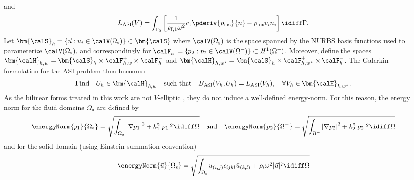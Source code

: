and
\begin{equation*}
	L_{\mathrm{ASI}}(V) = \int_{\Gamma_0} \left[\frac{1}{\rho_{\mathrm{f},1} \omega^2}q_1\pderiv{p_{\mathrm{inc}}}{n} - p_{\mathrm{inc}} v_i n_i\right]\idiff\Gamma.
\end{equation*}
Let $\bm{\calS}_h=\{\vec{u}: u_i\in \calV(\Omega_{\mathrm{s}})\}\subset\bm{\calS}$ where $\calV(\Omega_{\mathrm{s}})$ is the space spanned by the NURBS basis functions used to parameterize $\calV(\Omega_{\mathrm{s}})$, and correspondingly for $\calF^-_h=\{p_2: p_2\in \calV(\Omega^-)\}\subset H^1(\Omega^-)$. Moreover, define the spaces $\bm{\calH}_{h,w} = \bm{\calS}_h \times \calF^+_{h,w} \times \calF^-_h$ and $\bm{\calH}_{h,w^*} = \bm{\calS}_h\times \calF^+_{h,w^*} \times \calF^-_h$. The Galerkin formulation for the ASI problem then becomes: 
\begin{equation}
	\text{Find}\quad U_h\in\bm{\calH}_{h,w}\quad \text{such that} \quad B_{\mathrm{ASI}}(V_h,U_h) = L_{\mathrm{ASI}}(V_h),\quad \forall V_h\in\bm{\calH}_{h,w^*}.
\end{equation}
As the bilinear forms treated in this work are not $V$-elliptic \cite[p. 46]{Ihlenburg1998fea}, they do not induce a well-defined energy-norm. For this reason, the energy norm for the fluid domains $\Omega_{\mathrm{a}}$ are defined by
\begin{equation}\label{Eq2:energyNormFluids}
	\energyNorm{p_1}{\Omega_{\mathrm{a}}} = \sqrt{\int_{\Omega_{\mathrm{a}}} \left|\nabla p_1\right|^2 + k_1^2|p_1|^2 \idiff\Omega}\quad\text{and}\quad\energyNorm{p_2}{\Omega^-} = \sqrt{\int_{\Omega^-} \left|\nabla p_2\right|^2 + k_2^2|p_2|^2 \idiff\Omega}
\end{equation}
and for the solid domain (using Einstein summation convention)
\begin{equation}
	\energyNorm{\vec{u}}{\Omega_{\mathrm{s}}} = \sqrt{\int_{\Omega_{\mathrm{s}}} u_{(i,j)}c_{ijkl}\bar{u}_{(k,l)} + \rho_{\mathrm{s}}\omega^2|\vec{u}|^2\idiff\Omega}
\end{equation}
